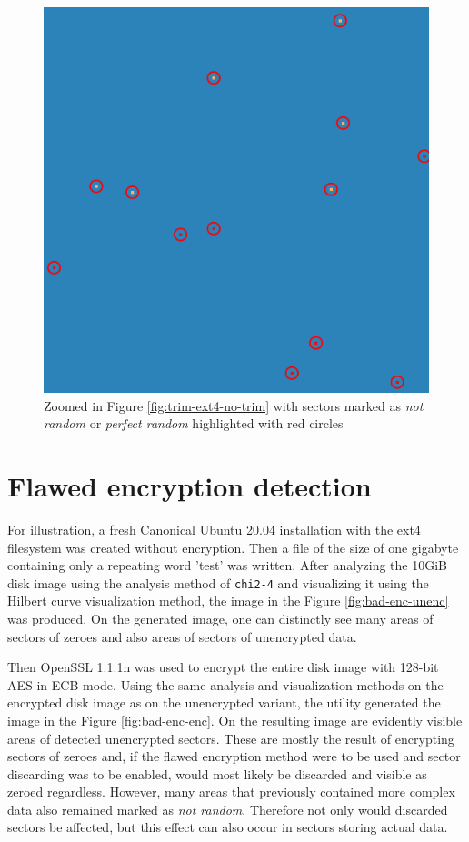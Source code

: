 \documentclass[
  digital, %
  color,   %
  oneside, %
  lof,     %
  nolot,     %
]{fithesis4}
\begin{document}
\begin{figure}
    \centering
    \includegraphics[width=.95\textwidth,interpolate=false]{test-ext4-no-trim-chi2-4-sweeping-zoomed.png}
    \caption{Zoomed in Figure \ref{fig:trim-ext4-no-trim} with sectors marked as \emph{not random} or \emph{perfect random} highlighted with red circles}
    \label{fig:trim-zoomed}
\end{figure}

\section{Flawed encryption detection}
\label{sec:flawed-encryption}

For illustration, a fresh Canonical Ubuntu 20.04\cite{ubuntu} installation with the ext4 filesystem was created without encryption.
Then a file of the size of one gigabyte containing only a repeating word 'test' was written.
After analyzing the 10GiB disk image using the analysis method of \texttt{chi2-4} and visualizing it using the Hilbert curve visualization method, the image in the Figure \ref{fig:bad-enc-unenc} was produced.
On the generated image, one can distinctly see many areas of sectors of zeroes and also areas of sectors of unencrypted data.

Then OpenSSL 1.1.1n\cite{openssl} was used to encrypt the entire disk image with 128-bit AES in ECB mode.
Using the same analysis and visualization methods on the encrypted disk image as on the unencrypted variant, the utility generated the image in the Figure \ref{fig:bad-enc-enc}.
On the resulting image are evidently visible areas of detected unencrypted sectors.
These are mostly the result of encrypting sectors of zeroes and, if the flawed encryption method were to be used and sector discarding was to be enabled, would most likely be discarded and visible as zeroed regardless.
However, many areas that previously contained more complex data also remained marked as \emph{not random}.
Therefore not only would discarded sectors be affected, but this effect can also occur in sectors storing actual data.
\end{document}
